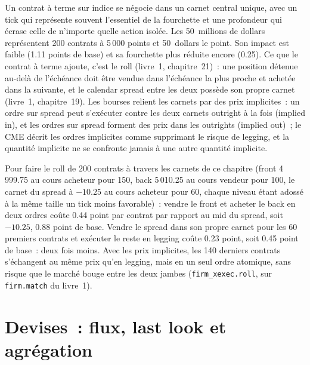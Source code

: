Un contrat à terme sur indice se négocie dans un carnet central unique, avec un tick qui représente souvent l'essentiel de la fourchette et une profondeur qui écrase celle de n'importe quelle action isolée. Les 50~millions de dollars représentent
200 contrats à 5\,000 points et 50~dollars le point. Son impact est faible (1.11 points de base) et sa fourchette plus réduite encore (0.25). Ce que le contrat à terme ajoute, c'est le roll
(livre~1, chapitre~21)~: une position détenue au-delà de l'échéance doit être vendue dans l'échéance la plus proche et achetée dans la suivante, et le calendar spread entre
les deux possède son propre carnet (livre~1, chapitre~19). Les bourses relient les carnets par des prix implicites~: un ordre sur spread peut s'exécuter contre les deux carnets outright à la
fois (implied in), et les ordres sur spread forment des prix dans les outrights (implied out)~; le CME décrit les ordres implicites comme supprimant le risque de legging, et la
quantité implicite ne se confronte jamais à une autre quantité implicite.

Pour faire le roll de 200 contrats à travers les carnets de ce chapitre (front 4\,999.75 au cours acheteur pour 150, back 5\,010.25 au cours vendeur pour 100, le carnet du spread à $-10.25$ au cours acheteur pour 60,
chaque niveau étant adossé à la même taille un tick moins favorable)~: vendre le front et acheter le back en deux ordres coûte 0.44 point par contrat par rapport au
mid du spread, soit $-10.25$, 0.88 point de base. Vendre le spread dans son propre carnet pour les 60 premiers contrats et exécuter le reste en legging coûte 0.23 point, soit 0.45
point de base~: deux fois moins. Avec les prix implicites, les 140 derniers contrats s'échangent au même prix qu'en legging, mais en un seul ordre atomique, sans risque que le marché
bouge entre les deux jambes (\texttt{firm\_xexec.roll}, sur \texttt{firm.match} du livre~1).

\label{lst:mx:execution-beyond-equities:roll}

\section{Devises~: flux, last look et agrégation}

